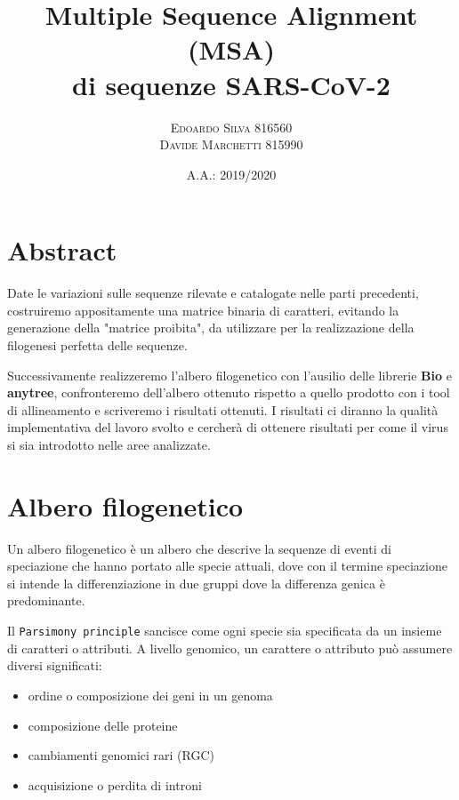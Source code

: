 \documentclass[11pt,italian]{article}
\title{Multiple Sequence Alignment (MSA) \\ di sequenze SARS-CoV-2}
\date{A.A.: 2019/2020}
\author{
    \textsc{Edoardo Silva} 816560 \\
    \textsc{Davide Marchetti} 815990
}
\begin{document}
\maketitle

\section{Abstract}
Date le variazioni sulle sequenze rilevate e catalogate nelle parti precedenti, costruiremo appositamente una matrice binaria di caratteri, evitando la generazione della "matrice proibita", da utilizzare per la realizzazione della filogenesi perfetta delle sequenze.

Successivamente realizzeremo l'albero filogenetico con l'ausilio delle librerie \textbf{Bio} e \textbf{anytree}, confronteremo dell'albero ottenuto rispetto a quello prodotto con i tool di allineamento e scriveremo i risultati ottenuti. \newline
I risultati ci diranno la qualità implementativa del lavoro svolto e cercherà di ottenere risultati per come il virus si sia introdotto nelle aree analizzate. 

\newpage

\section{Albero filogenetico}
Un albero filogenetico è un albero che descrive la sequenze di eventi di speciazione che hanno portato alle specie attuali, dove con il termine speciazione si intende la differenziazione in due gruppi dove la differenza genica è predominante.

Il \lstinline{Parsimony principle} sancisce come ogni specie sia specificata da un insieme di caratteri o attributi.
A livello genomico, un carattere o attributo può assumere diversi significati:
\begin{itemize}
  \item ordine o composizione dei geni in un genoma
  \item composizione delle proteine
  \item cambiamenti genomici rari (RGC)
  \item acquisizione o perdita di introni
\end{itemize}
\end{document}
